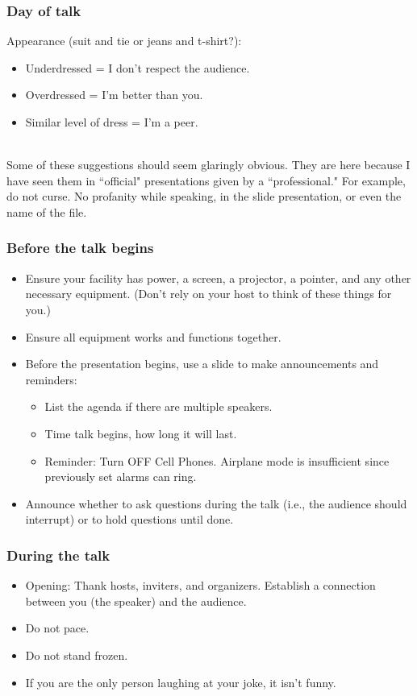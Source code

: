 \subsubsection*{Day of talk}

Appearance (suit and tie or jeans and t-shirt?):
\begin{itemize}
    \item Underdressed = I don't respect the audience.
    \item Overdressed = I'm better than you.
    \item Similar level of dress = I'm a peer.
\end{itemize}

\ \\

Some of these suggestions should seem glaringly obvious. They are here because I have seen them in ``official" presentations given by a ``professional." For example, do not curse. No profanity while speaking, in the slide presentation, or even the name of the file.

\subsubsection*{Before the talk begins}
\begin{itemize}
    \item Ensure your facility has power, a screen, a projector, a pointer, and any other necessary equipment. (Don't rely on your host to think of these things for you.)
    \item Ensure all equipment works and functions together.
    \item Before the presentation begins, use a slide to make announcements and reminders:
\begin{itemize}
    \item List the agenda if there are multiple speakers.
    \item Time talk begins, how long it will last.
    \item Reminder: Turn OFF Cell Phones. Airplane mode is insufficient since previously set alarms can ring.
\end{itemize}
    \item Announce whether to ask questions during the talk (i.e., the audience should interrupt) or to hold questions until done.
\end{itemize}

\subsubsection*{During the talk}
\begin{itemize}
    \item Opening: Thank hosts, inviters, and organizers. Establish a connection between you (the speaker) and the audience.
    \item Do not pace.
    \item Do not stand frozen.
    \item If you are the only person laughing at your joke, it isn't funny.
\end{itemize}

